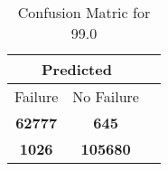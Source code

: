 \begin{table}[] 
\caption{Confusion Matric for 99.0} 
\label{Table: Prediction Accuracy-None99.0DecisionTrees100EKF-ignoresolarPanelDipole-solarPanelDipole} 
\centering 
\begin{tabular} 
 {@{}ccc@{}} 
\toprule 
\multicolumn{2}{c}{\textbf{Predicted}}
 \\ \midrule 
\multicolumn{1}{|c|}{Failure} & 
\multicolumn{1}{c|}{No Failure}
 \\ \midrule 
\multicolumn{1}{|c|}{\color{green}\textbf{62777}} & 
\multicolumn{1}{c|}{\color{red}\textbf{645}}
 \\ \midrule 
\multicolumn{1}{|c|}{\color{red}\textbf{1026}} & 
\multicolumn{1}{c|}{\color{green}\textbf{105680}}
 \\ \bottomrule 
\end{tabular} 
\end{table} 

